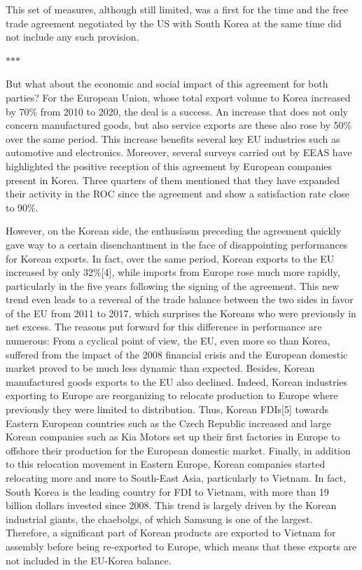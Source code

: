 \documentclass[11pt,a4paper]{article}
\newcommand{\partbreak}{\par\begin{center}\color{muted}$\ast$\quad$\ast$\quad$\ast$\end{center}\par}
\begin{document}
This set of measures, although still limited, was a first for the time and the free trade agreement negotiated by the US with South Korea at the same time did not include any such provision.

\partbreak

But what about the economic and social impact of this agreement for both parties? For the European Union, whose total export volume to Korea increased by 70\% from 2010 to 2020, the deal is a success. An increase that does not only concern manufactured goods, but also service exports are these also rose by 50\% over the same period. This increase benefits several key EU industries such as automotive and electronics. Moreover, several surveys carried out by EEAS have highlighted the positive reception of this agreement by European companies present in Korea. Three quarters of them mentioned that they have expanded their activity in the ROC since the agreement and show a satisfaction rate close to 90\%.

However, on the Korean side, the enthusiasm preceding the agreement quickly gave way to a certain disenchantment in the face of disappointing performances for Korean exports. In fact, over the same period, Korean exports to the EU increased by only 32\%{[}4{]}, while imports from Europe rose much more rapidly, particularly in the five years following the signing of the agreement. This new trend even leads to a reversal of the trade balance between the two sides in favor of the EU from 2011 to 2017, which surprises the Koreans who were previously in net excess. The reasons put forward for this difference in performance are numerous: From a cyclical point of view, the EU, even more so than Korea, suffered from the impact of the 2008 financial crisis and the European domestic market proved to be much less dynamic than expected. Besides, Korean manufactured goods exports to the EU also declined. Indeed, Korean industries exporting to Europe are reorganizing to relocate production to Europe where previously they were limited to distribution. Thus, Korean FDIs{[}5{]} towards Eastern European countries such as the Czech Republic increased and large Korean companies such as Kia Motors set up their first factories in Europe to offshore their production for the European domestic market. Finally, in addition to this relocation movement in Eastern Europe, Korean companies started relocating more and more to South-East Asia, particularly to Vietnam. In fact, South Korea is the leading country for FDI to Vietnam, with more than 19 billion dollars invested since 2008. This trend is largely driven by the Korean industrial giants, the chaebolgs, of which Samsung is one of the largest. Therefore, a significant part of Korean products are exported to Vietnam for assembly before being re-exported to Europe, which means that these exports are not included in the EU-Korea balance.
\end{document}
